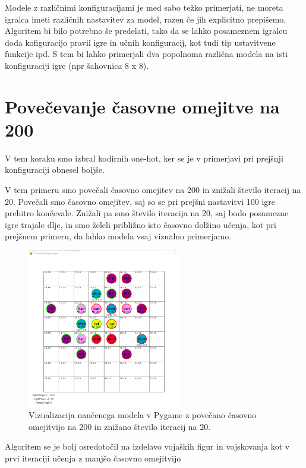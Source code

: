 \documentclass[a4paper, 12pt]{book}
\begin{document}
Modele z različnimi konfiguracijami je med sabo težko primerjati, ne moreta igralca imeti različnih nastavitev za model, razen če jih explicitno prepišemo.
Algoritem bi bilo potrebno še predelati, tako da se lahko posameznem igralcu doda kofiguracijo pravil igre in učnih konfiguracij, kot tudi tip ustavitvene funkcije ipd.
S tem bi lahko primerjali dva popolnoma različna modela na isti konfiguraciji igre (npr šahovnica 8 x 8).

\section{Povečevanje časovne omejitve na 200}
\label{resultSecond}
V tem koraku smo izbral kodirnih one-hot, ker se je v primerjavi pri prejšnji konfiguraciji obnesel boljše.

V tem primeru smo povečali časovno omejitev na 200 in znižali število iteracij na 20.
Povečali smo časovno omejitev, saj so se pri prejšni nastavitvi 100 igre prehitro končevale.
Znižali pa smo število iteracija na 20, saj bodo posamezne igre trajale dlje, in smo želeli približno isto časovno dolžino učenja, kot pri prejšnem primeru, da lahko modela vsaj vizualno primerjamo.

\begin{figure}[h]
	\begin{center}
		\includegraphics[width=0.6\textwidth]{second-2018-11-12.pdf}
	\end{center}
	\caption{Vizualizacija naučenega modela v Pygame z povečano časovno omejitvijo  na 200 in znižano število iteracij na 20.}
	\label{vizualizacijaRezultatov200timeout20Iters}
\end{figure}

Algoritem se je bolj osredotočil na izdelavo vojaških figur in vojskovanja kot v prvi iteraciji učenja z manjšo časovno omejitvijo
\end{document}

